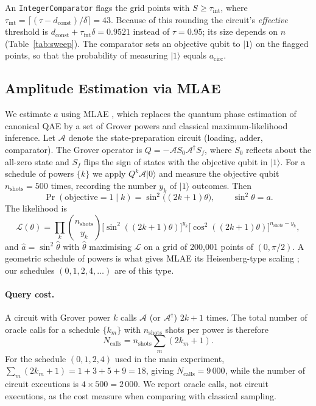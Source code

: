\documentclass[pdflatex,sn-mathphys-num]{sn-jnl}%
\theoremstyle{thmstyleone}%
\theoremstyle{thmstyletwo}%
\theoremstyle{thmstylethree}%
\begin{document}
An \texttt{IntegerComparator} flags the grid points with $S\ge\tau_{\mathrm{int}}$, where $\tau_{\mathrm{int}}=\lceil(\tau-d_{\mathrm{const}})/\delta\rceil=43$. Because of this rounding the circuit's \emph{effective} threshold is $d_{\mathrm{const}}+\tau_{\mathrm{int}}\delta=0.9521$ instead of $\tau=0.95$; its size depends on $n$ (Table~\ref{tab:sweep}). The comparator sets an objective qubit to $|1\rangle$ on the flagged points, so that the probability of measuring $|1\rangle$ equals $a_{\mathrm{circ}}$.

\subsection{Amplitude Estimation via MLAE}

We estimate $a$ using MLAE \cite{suzuki2020amplitude}, which replaces the quantum phase estimation of canonical QAE by a set of Grover powers and classical maximum-likelihood inference. Let $\mathcal{A}$ denote the state-preparation circuit (loading, adder, comparator). The Grover operator is $Q=-\mathcal{A}S_0\mathcal{A}^\dagger S_f$, where $S_0$ reflects about the all-zero state and $S_f$ flips the sign of states with the objective qubit in $|1\rangle$. For a schedule of powers $\{k\}$ we apply $Q^k\mathcal{A}|0\rangle$ and measure the objective qubit $n_{\mathrm{shots}}=500$ times, recording the number $y_k$ of $|1\rangle$ outcomes. Then
\begin{equation}
\Pr(\text{objective}=1\mid k)=\sin^2\!\bigl((2k+1)\theta\bigr),\qquad \sin^2\theta=a.
\end{equation}
The likelihood is
\begin{equation}
\mathcal{L}(\theta)=\prod_{k}\binom{n_{\mathrm{shots}}}{y_k}\bigl[\sin^2((2k+1)\theta)\bigr]^{y_k}\bigl[\cos^2((2k+1)\theta)\bigr]^{n_{\mathrm{shots}}-y_k},
\end{equation}
and $\hat a=\sin^2\hat\theta$ with $\hat\theta$ maximising $\mathcal L$ on a grid of 200,001 points of $(0,\pi/2)$. A geometric schedule of powers is what gives MLAE its Heisenberg-type scaling \cite{suzuki2020amplitude}; our schedules $(0,1,2,4,\dots)$ are of this type.

\paragraph{Query cost.} A circuit with Grover power $k$ calls $\mathcal{A}$ (or $\mathcal{A}^\dagger$) $2k+1$ times. The total number of oracle calls for a schedule $\{k_m\}$ with $n_{\mathrm{shots}}$ shots per power is therefore
\begin{equation}
N_{\mathrm{calls}} = n_{\mathrm{shots}}\sum_m (2k_m+1).
\label{eq:calls}
\end{equation}
For the schedule $(0,1,2,4)$ used in the main experiment, $\sum_m(2k_m+1)=1+3+5+9=18$, giving $N_{\mathrm{calls}}=9\,000$, while the number of circuit executions is $4\times500=2\,000$. We report oracle calls, not circuit executions, as the cost measure when comparing with classical sampling.
\end{document}
